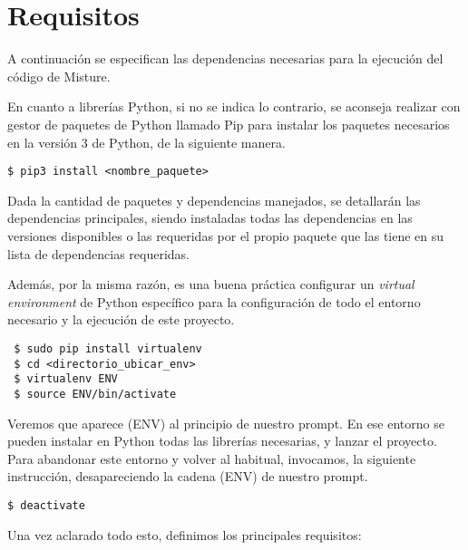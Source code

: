 \cleardoublepage

\chapter{Requisitos}
\label{app:req}

A continuación se especifican las dependencias necesarias para la ejecución del código de Misture.

En cuanto a librerías Python, si no se indica lo contrario, se aconseja realizar con gestor de paquetes de Python llamado Pip para instalar los paquetes necesarios en la versión 3 de Python, de la siguiente manera.
\begin{center}
\begin{verbatim}
$ pip3 install <nombre_paquete>
\end{verbatim}
\end{center}


Dada la cantidad de paquetes y dependencias manejados, se detallarán las dependencias principales, siendo instaladas todas las dependencias en las versiones disponibles o las requeridas por el propio paquete que las tiene en su lista de dependencias requeridas.


Además, por la misma razón, es una buena práctica configurar un \textit{virtual environment} de Python específico para la configuración de todo el entorno necesario y la ejecución de este proyecto.
\begin{center}
\begin{verbatim}
 $ sudo pip install virtualenv
 $ cd <directorio_ubicar_env>
 $ virtualenv ENV
 $ source ENV/bin/activate
\end{verbatim}
\end{center}

Veremos que aparece (ENV) al principio de nuestro prompt. En ese entorno se pueden instalar en Python todas las librerías necesarias, y lanzar el proyecto. Para abandonar este entorno y volver al habitual, invocamos, la siguiente instrucción, desapareciendo la cadena (ENV) de nuestro prompt.
\begin{center}
\begin{verbatim}
$ deactivate
\end{verbatim}
\end{center}

Una vez aclarado todo esto, definimos los principales requisitos:

